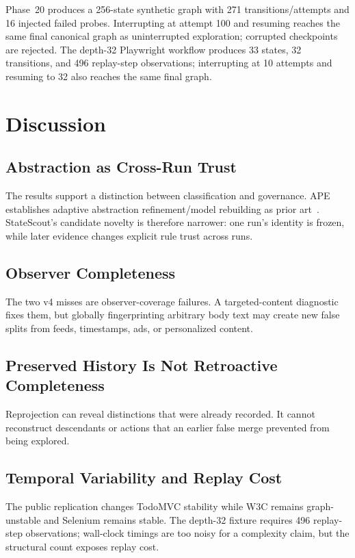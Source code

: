 \documentclass[conference]{IEEEtran}
\begin{document}
Phase~20 produces a 256-state synthetic graph with 271 transitions/attempts and 16 injected failed probes. Interrupting at attempt 100 and resuming reaches the same final canonical graph as uninterrupted exploration; corrupted checkpoints are rejected. The depth-32 Playwright workflow produces 33 states, 32 transitions, and 496 replay-step observations; interrupting at 10 attempts and resuming to 32 also reaches the same final graph.

\section{Discussion}
\subsection{Abstraction as Cross-Run Trust}
The results support a distinction between classification and governance. APE establishes adaptive abstraction refinement/model rebuilding as prior art~\cite{gu2019ape}. StateScout's candidate novelty is therefore narrower: one run's identity is frozen, while later evidence changes explicit rule trust across runs.

\subsection{Observer Completeness}
The two v4 misses are observer-coverage failures. A targeted-content diagnostic fixes them, but globally fingerprinting arbitrary body text may create new false splits from feeds, timestamps, ads, or personalized content.

\subsection{Preserved History Is Not Retroactive Completeness}
Reprojection can reveal distinctions that were already recorded. It cannot reconstruct descendants or actions that an earlier false merge prevented from being explored.

\subsection{Temporal Variability and Replay Cost}
The public replication changes TodoMVC stability while W3C remains graph-unstable and Selenium remains stable. The depth-32 fixture requires 496 replay-step observations; wall-clock timings are too noisy for a complexity claim, but the structural count exposes replay cost.
\end{document}
